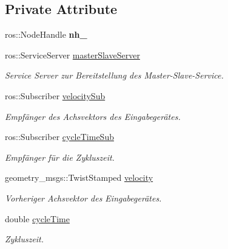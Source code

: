 \subsection*{Private Attribute}
\begin{DoxyCompactItemize}
\item 
\hypertarget{classMasterSlaveManipulation_a958d5aeb711682d6dc180631f39961fa}{ros\-::\-Node\-Handle {\bfseries nh\-\_\-}}\label{classMasterSlaveManipulation_a958d5aeb711682d6dc180631f39961fa}

\item 
ros\-::\-Service\-Server \hyperlink{classMasterSlaveManipulation_ad9ecf87702f7a462130fdb48fe3e8df2}{master\-Slave\-Server}
\begin{DoxyCompactList}\small\item\em Service Server zur Bereitstellung des Master-\/\-Slave-\/\-Service. \end{DoxyCompactList}\item 
ros\-::\-Subscriber \hyperlink{classMasterSlaveManipulation_ab7809d9d1d1b96530ca9aec2d10a0fab}{velocity\-Sub}
\begin{DoxyCompactList}\small\item\em Empfänger des Achsvektors des Eingabegerätes. \end{DoxyCompactList}\item 
ros\-::\-Subscriber \hyperlink{classMasterSlaveManipulation_ac8952201baad0d7dbc0d4e22b519ef70}{cycle\-Time\-Sub}
\begin{DoxyCompactList}\small\item\em Empfänger für die Zykluszeit. \end{DoxyCompactList}\item 
\hypertarget{classMasterSlaveManipulation_a75bc6790c25f850d5047b5b4217834fd}{geometry\-\_\-msgs\-::\-Twist\-Stamped \hyperlink{classMasterSlaveManipulation_a75bc6790c25f850d5047b5b4217834fd}{velocity}}\label{classMasterSlaveManipulation_a75bc6790c25f850d5047b5b4217834fd}

\begin{DoxyCompactList}\small\item\em Vorheriger Achsvektor des Eingabegerätes. \end{DoxyCompactList}\item 
\hypertarget{classMasterSlaveManipulation_a395fee7bb621b884b79f20e81a1934fc}{double \hyperlink{classMasterSlaveManipulation_a395fee7bb621b884b79f20e81a1934fc}{cycle\-Time}}\label{classMasterSlaveManipulation_a395fee7bb621b884b79f20e81a1934fc}

\begin{DoxyCompactList}\small\item\em Zykluszeit. \end{DoxyCompactList}\end{DoxyCompactItemize}


